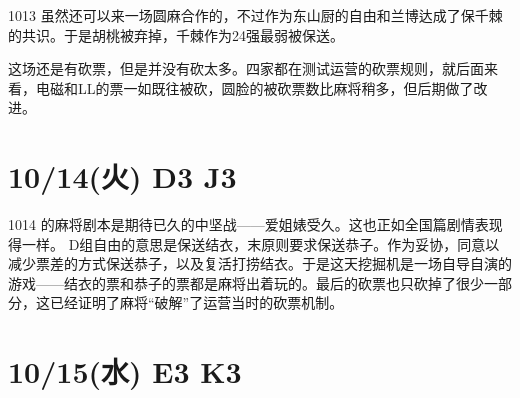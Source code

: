 1013 虽然还可以来一场圆麻合作的，不过作为东山厨的自由和兰博达成了保千棘的共识。于是胡桃被弃掉，千棘作为24强最弱被保送。

这场还是有砍票，但是并没有砍太多。四家都在测试运营的砍票规则，就后面来看，电磁和LL的票一如既往被砍，圆脸的被砍票数比麻将稍多，但后期做了改进。

\section{10/14(火) D3 J3}


1014 的麻将剧本是期待已久的中坚战——爱姐婊受久。这也正如全国篇剧情表现得一样。
D组自由的意思是保送结衣，末原则要求保送恭子。作为妥协，同意以减少票差的方式保送恭子，以及复活打捞结衣。于是这天挖掘机是一场自导自演的游戏——结衣的票和恭子的票都是麻将出着玩的。最后的砍票也只砍掉了很少一部分，这已经证明了麻将“破解”了运营当时的砍票机制。

\section{10/15(水) E3 K3}

